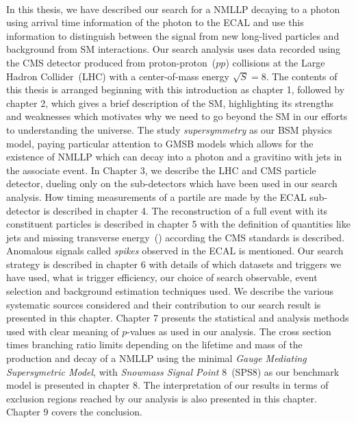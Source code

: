 \paragraph*{} %
In this thesis, we have described our search for a NMLLP decaying to a photon using arrival time information of the photon to the ECAL and use this information to distinguish between the signal from new long-lived particles and background from SM interactions. Our search analysis uses data recorded using the CMS detector produced from proton-proton~(\textbf{$pp$}) collisions at the Large Hadron Collider~(LHC) with a center-of-mass energy  $\sqrt{S} = 8 $\TeV.
The contents of this thesis is arranged beginning with this introduction as chapter 1, followed by chapter 2, which gives a 
brief description of the SM, highlighting its strengths and weaknesses which motivates why we need to go beyond the SM in our efforts to understanding the universe. The study \textit{supersymmetry} as our BSM physics model, paying particular attention to GMSB models which allows for the existence of NMLLP which can decay into a photon and a gravitino with jets in the associate event.
In Chapter 3,  we describe the  LHC and CMS particle detector, dueling only on the sub-detectors which have been used in our search analysis. How timing measurements of a partile are made by the ECAL sub-detector is described in chapter 4.
The reconstruction of a full event with its constituent particles is described in chapter 5 with the definition of quantities like jets and  missing transverse energy~(\MET) according the CMS standards is described. Anomalous signals called \textit{spikes} observed in the  ECAL is mentioned.
Our search strategy is described in chapter 6 with details of which datasets and triggers we have used, what is trigger efficiency, our choice of search observable, event selection and background estimation techniques used. We describe the various systematic sources considered and their contribution to our search result is presented in this chapter.
Chapter 7 presents the statistical and analysis methods used with clear meaning of $p$-values as used in our analysis.
The cross section times branching ratio limits depending on the lifetime and mass of the production and decay of a NMLLP using the minimal \textit{Gauge Mediating Supersymetric Model}, with \textit{Snowmass Signal Point} 8~(SPS8) as our benchmark model is presented in chapter 8. The interpretation of our results in terms of exclusion regions reached by our analysis is also presented in this chapter. %
Chapter 9 covers the conclusion.



